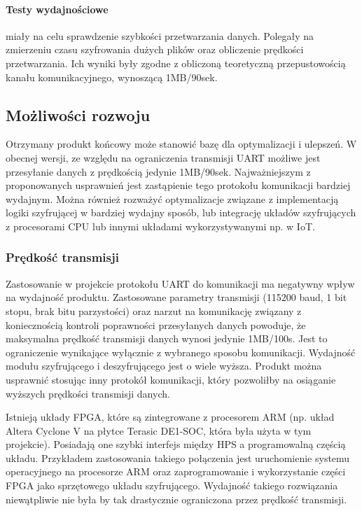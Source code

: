 \paragraph{Testy wydajnościowe} miały na celu sprawdzenie szybkości przetwarzania danych. Polegały na zmierzeniu czasu szyfrowania dużych plików oraz obliczenie prędkości przetwarzania. Ich wyniki były zgodne z obliczoną teoretyczną przepustowością kanału komunikacyjnego, wynoszącą 1MB/90sek.

\subsection{Możliwości rozwoju}
Otrzymany produkt końcowy może stanowić bazę dla optymalizacji i ulepszeń. W obecnej wersji, ze względu na ograniczenia transmisji UART możliwe jest przesyłanie danych z prędkością jedynie 1MB/90sek. Najważniejszym z proponowanych usprawnień jest zastąpienie tego protokołu komunikacji bardziej wydajnym. Można również rozważyć optymalizacje związane z implementacją logiki szyfrującej w bardziej wydajny sposób, lub integrację układów szyfrujących z procesorami CPU lub innymi układami wykorzystywanymi np. w IoT.

\subsubsection{Prędkość transmisji}
Zastosowanie w projekcie protokołu UART do komunikacji ma negatywny wpływ na wydajność produktu. Zastosowane parametry transmisji (115200 baud, 1 bit stopu, brak bitu parzystości) oraz narzut na komunikację związany z koniecznością kontroli poprawności przesyłanych danych powoduje, że maksymalna prędkość transmisji danych wynosi jedynie 1MB/100s. Jest to ograniczenie wynikające wyłącznie z wybranego sposobu komunikacji. Wydajność modułu szyfrującego i deszyfrującego jest o wiele wyższa. Produkt można usprawnić stosując inny protokół komunikacji, który pozwoliłby na osiąganie wyższych prędkości transmisji danych.

Istnieją układy FPGA, które są zintegrowane z procesorem ARM (np. układ Altera Cyclone V na płytce Terasic DE1-SOC, która była użyta w tym projekcie). Posiadają one szybki interfejs między HPS a programowalną częścią układu. Przykładem zastosowania takiego połączenia jest uruchomienie systemu operacyjnego na procesorze ARM oraz zaprogramowanie i wykorzystanie części FPGA jako sprzętowego układu szyfrującego. Wydajność takiego rozwiązania niewątpliwie nie była by tak drastycznie ograniczona przez prędkość transmisji.


